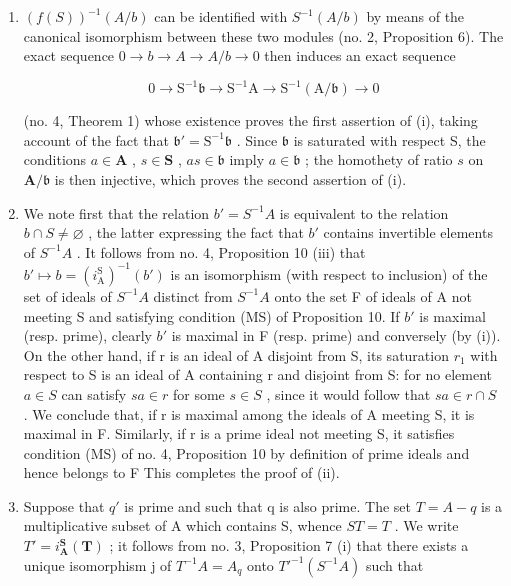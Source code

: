 \begin{enumerate}
\def\labelenumi{(\roman{enumi})}
\item
  \((f(S))^{-1}(A/b)\) can be identified with \(S^{-1}(A/b)\) by means of the canonical isomorphism between these two modules (no. 2, Proposition 6). The exact sequence \(0 \rightarrow b \rightarrow A \rightarrow A/b \rightarrow 0\) then induces an exact sequence

\[
0 \rightarrow \mathrm{S} ^ {- 1} \mathfrak {b} \rightarrow \mathrm{S} ^ {- 1} \mathrm{A} \rightarrow \mathrm{S} ^ {- 1} (\mathrm{A} / \mathfrak {b}) \rightarrow 0
\]

(no. 4, Theorem 1) whose existence proves the first assertion of (i), taking account of the fact that \(\mathfrak{b}' = \mathrm{S}^{-1}\mathfrak{b}\) . Since \(\mathfrak{b}\) is saturated with respect S, the conditions \(a \in \mathbf{A}\) , \(s \in \mathbf{S}\) , \(as \in \mathfrak{b}\) imply \(a \in \mathfrak{b}\) ; the homothety of ratio \(s\) on \(\mathbf{A}/\mathfrak{b}\) is then injective, which proves the second assertion of (i).

\item
  We note first that the relation \(b' = S^{-1}A\) is equivalent to the relation \(b \cap S \neq \varnothing\) , the latter expressing the fact that \(b'\) contains invertible elements of \(S^{-1}A\) . It follows from no. 4, Proposition 10 (iii) that \(b' \mapsto b = (i_{\mathrm{A}}^{\mathrm{S}})^{-1}(b')\) is an isomorphism (with respect to inclusion) of the set of ideals of \(S^{-1}A\) distinct from \(S^{-1}A\) onto the set F of ideals of A not meeting S and satisfying condition (MS) of Proposition 10. If \(b'\) is maximal (resp. prime), clearly \(b'\) is maximal in F (resp. prime) and conversely (by (i)). On the other hand, if r is an ideal of A disjoint from S, its saturation \(r_{1}\) with respect to S is an ideal of A containing r and disjoint from S: for no element \(a \in S\) can satisfy \(sa \in r\) for some \(s \in S\) , since it would follow that \(sa \in r \cap S\) . We conclude that, if r is maximal among the ideals of A meeting S, it is maximal in F. Similarly, if r is a prime ideal not meeting S, it satisfies condition (MS) of no. 4, Proposition 10 by definition of prime ideals and hence belongs to F This completes the proof of (ii).
\item
  Suppose that \(q'\) is prime and such that q is also prime. The set \(T = A - q\) is a multiplicative subset of A which contains S, whence \(ST = T\) . We write \(T' = i_{\mathbf{A}}^{\mathbf{S}}(\mathbf{T})\) ; it follows from no. 3, Proposition 7 (i) that there exists a unique isomorphism j of \(T^{-1}A = A_{q}\) onto \(T'^{-1}(S^{-1}A)\) such that


\end{enumerate}
